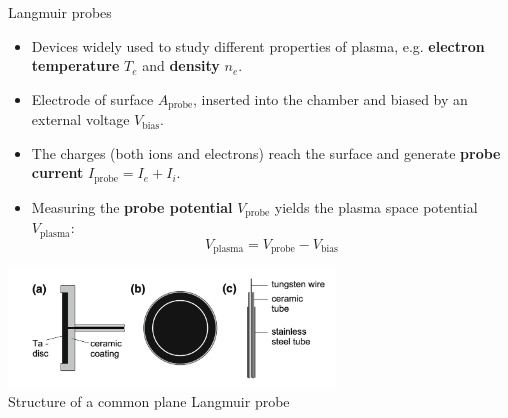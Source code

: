\documentclass[10pt]{beamer}
\newcommand{\probecurrent}[0]{\ensuremath{I_{\mathrm{probe}}}}
\newcommand{\biasvoltage}{\ensuremath{V_{\mathrm{bias}}}}
\newcommand{\probevoltage}{\ensuremath{V_{\mathrm{probe}}}}
\newcommand{\plasmavoltage}{\ensuremath{V_{\mathrm{plasma}}}}
\begin{document}
\begin{frame}{{Langmuir probes}}
    \vspace{0.2cm}
    \begin{itemize}
        \item Devices widely used to study different properties of plasma, e.g. \textbf{electron temperature} $T_e$ and \textbf{density} $n_e$.
        
        \item Electrode of surface $A_{\mathrm{probe}}$, inserted into the chamber and biased by an external voltage $\biasvoltage$.
        \item The charges (both ions and electrons) reach the surface and generate \textbf{probe current} $\probecurrent = I_e + I_i$.
        \item Measuring the \textbf{probe potential} $\probevoltage$ yields the plasma space potential $\plasmavoltage$:
        \begin{equation*}
            \plasmavoltage = \probevoltage - \biasvoltage
        \end{equation*}
    \end{itemize}

    \begin{center}
        \includegraphics[width=0.65\textwidth]{../figures/langmuir_probe.png}
        \\
        \small Structure of a common plane Langmuir probe\, 
    \end{center}
\end{frame}
\end{document}
